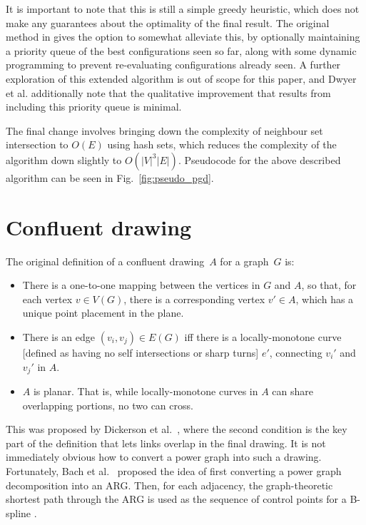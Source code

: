 It is important to note that this is still a simple greedy heuristic, which does not make any guarantees about the optimality of the final result.
The original method in \cite{Dwyer2014} gives the option to somewhat alleviate this, by optionally maintaining a priority queue of the best configurations seen so far, along with some dynamic programming to prevent re-evaluating configurations already seen.
A further exploration of this extended algorithm is out of scope for this paper, and Dwyer et al. \cite{Dwyer2014} additionally note that the qualitative improvement that results from including this priority queue is minimal.

The final change involves bringing down the complexity of neighbour set intersection to $O(E)$ using hash sets, which reduces the complexity of the algorithm down slightly to $O(|V|^3|E|)$.
Pseudocode for the above described algorithm can be seen in Fig.~\ref{fig:pseudo_pgd}.

\section{Confluent drawing}
\label{sec:confluent_definition}
The original definition of a confluent drawing~$A$ for a graph~$G$ is:
\begin{mdframed}[backgroundcolor=WhiteSmoke]
\begin{itemize}[leftmargin=*]
  \item There is a one-to-one mapping between the vertices in $G$ and $A$, so that, for each vertex $v\in V(G)$, there is a corresponding vertex $v'\in A$, which has a unique point placement in the plane.
  \item There is an edge $(v_i,v_j) \in E(G)$ iff there is a locally-monotone curve [defined as having no self intersections or sharp turns] $e'$, connecting $v_i'$ and $v_j'$ in $A$. 
  \item $A$ is planar. That is, while locally-monotone curves in $A$ can share overlapping portions, no two can cross.
\end{itemize}
\end{mdframed}
This was proposed by Dickerson et al.\ \cite{Dickerson2005}, where the second condition is the key part of the definition that lets links overlap in the final drawing.
It is not immediately obvious how to convert a power graph into such a drawing. Fortunately, Bach et al.\ \cite{Bach2017} proposed the idea of first converting a power graph decomposition into an ARG. Then, for each adjacency, the graph-theoretic shortest path through the ARG is used as the sequence of control points for a B-spline \cite{Sederberg2005}.

